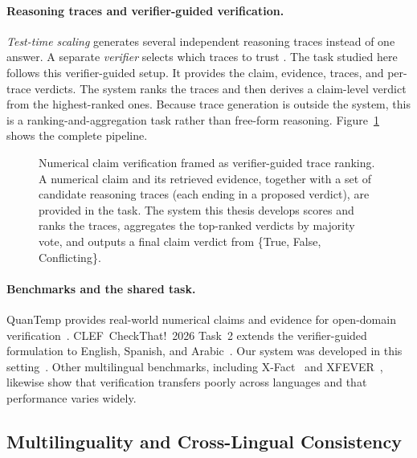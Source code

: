 \paragraph{Reasoning traces and verifier-guided verification.}
\emph{Test-time scaling} generates several independent reasoning traces instead of one answer. A
separate \emph{verifier} selects which traces to trust
\cite{chungkham2025thinkrightmoretesttime}. The task studied here follows this verifier-guided setup.
It provides the claim, evidence, traces, and per-trace verdicts. The system ranks the traces and then
derives a claim-level verdict from the highest-ranked ones. Because trace generation is outside the
system, this is a ranking-and-aggregation task rather than free-form reasoning.
Figure~\ref{fig:factcheck-pipeline} shows the complete pipeline.

\begin{figure}[htbp]
  \centering
  
  \caption{Numerical claim verification framed as verifier-guided trace ranking. A numerical claim and
  its retrieved evidence, together with a set of candidate reasoning traces (each ending in a proposed
  verdict), are provided in the task. The system this thesis develops scores and ranks the traces,
  aggregates the top-ranked verdicts by majority vote, and outputs a final claim verdict from
  \{\textsf{True}, \textsf{False}, \textsf{Conflicting}\}.}
  \label{fig:factcheck-pipeline}
\end{figure}

\paragraph{Benchmarks and the shared task.}
QuanTemp provides real-world numerical claims and evidence for open-domain
verification~\cite{v2024quantemprealworldopendomainbenchmark}. CLEF~CheckThat!~2026 Task~2 extends the
verifier-guided formulation to English, Spanish, and Arabic~\cite{clef-checkthat:2026:task2}. Our
system was developed in this setting~\cite{khawaja2026gipplab}. Other multilingual benchmarks,
including X-Fact~\cite{gupta2021xfactnewbenchmarkdataset} and
XFEVER~\cite{chang2023xfeverexploringfactverification}, likewise show that verification transfers
poorly across languages and that performance varies widely.

\subsection{Multilinguality and Cross-Lingual Consistency}
\label{subsec:bg-multilingual}

